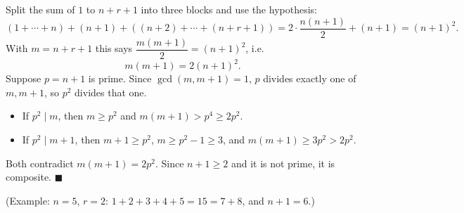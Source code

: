 Split the sum of $1$ to $n+r+1$ into three blocks and use the hypothesis:
\[(1+\cdots+n)+(n+1)+\left((n+2)+\cdots+(n+r+1)\right)=2\cdot\dfrac{n(n+1)}{2}+(n+1)=(n+1)^2.\]
With $m=n+r+1$ this says $\dfrac{m(m+1)}{2}=(n+1)^2$, i.e.
\[m(m+1)=2(n+1)^2.\]
Suppose $p=n+1$ is prime. Since $\gcd(m,m+1)=1$, $p$ divides exactly one of $m,m+1$, so $p^2$ divides that one.
\begin{itemize}
\item If $p^2\mid m$, then $m\ge p^2$ and $m(m+1)>p^4\ge2p^2$.
\item If $p^2\mid m+1$, then $m+1\ge p^2$, $m\ge p^2-1\ge3$, and $m(m+1)\ge3p^2>2p^2$.
\end{itemize}
Both contradict $m(m+1)=2p^2$. Since $n+1\ge2$ and it is not prime, it is composite. $\blacksquare$

(Example: $n=5$, $r=2$: $1+2+3+4+5=15=7+8$, and $n+1=6$.)
